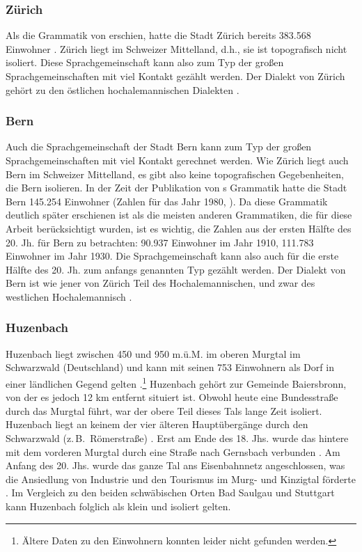 \subsubsection{Zürich}

Als die Grammatik von \citet{Weber1987} erschien, hatte die Stadt Zürich bereits 383.568 Einwohner \citep{Zürich2015}. Zürich liegt im Schweizer Mittelland, d.h., sie ist topografisch nicht isoliert. Diese Sprachgemeinschaft kann also zum Typ der großen Sprachgemeinschaften mit viel Kontakt gezählt werden. Der Dialekt von Zürich gehört zu den östlichen hochalemannischen Dialekten \citep[51–67]{Hotzenköcherle1984}. 

\subsubsection{Bern}

Auch die Sprachgemeinschaft der Stadt Bern kann zum Typ der großen Sprachgemeinschaften mit viel Kontakt gerechnet werden. Wie Zürich liegt auch Bern im Schweizer Mittelland, es gibt also keine topografischen Gegebenheiten, die Bern isolieren. In der Zeit der Publikation von \citeauthor{Marti1985}s \citeyearpar{Marti1985} Grammatik hatte die Stadt Bern 145.254 Einwohner (Zahlen für das Jahr 1980, \citealt{Bern2014}). Da diese Grammatik deutlich später erschienen ist als die meisten anderen Grammatiken, die für diese Arbeit berücksichtigt wurden, ist es wichtig, die Zahlen aus der ersten Hälfte des 20. Jh. für Bern zu betrachten: 90.937 Einwohner im Jahr 1910, 111.783 Einwohner im Jahr 1930. Die Sprachgemeinschaft kann also auch für die erste Hälfte des 20. Jh. zum anfangs genannten Typ gezählt werden. Der Dialekt von Bern ist wie jener von Zürich Teil des Hochalemannischen, und zwar des westlichen Hochalemannisch \citep[51--67]{Hotzenköcherle1984}.

\subsubsection{Huzenbach}\largerpage[1]

Huzenbach liegt zwischen 450 und 950 m.ü.M. im oberen Murgtal im Schwarzwald (Deutschland) und kann mit seinen 753 Einwohnern als Dorf in einer ländlichen Gegend gelten \citep{Baiersbronn2015}.\footnote{Ältere Daten zu den Einwohnern konnten leider nicht gefunden werden.} Huzenbach gehört zur Gemeinde Baiersbronn, von der es jedoch 12 km entfernt situiert ist. Obwohl heute eine Bundesstraße durch das Murgtal führt, war der obere Teil dieses Tals lange Zeit isoliert. Huzenbach liegt an keinem der vier älteren Hauptübergänge durch den Schwarzwald (z.\,B.\ Römerstraße) \citep[28–29]{Baur1967}. Erst am Ende des 18. Jhs. wurde das hintere mit dem vorderen Murgtal durch eine Straße nach Gernsbach verbunden \citep[29]{Baur1967}. Am Anfang des 20. Jhs. wurde das ganze Tal ans Eisenbahnnetz angeschlossen, was die Ansiedlung von Industrie und den Tourismus im Murg- und Kinzigtal förderte \citep[30]{Baur1967}. Im Vergleich zu den beiden schwäbischen Orten Bad Saulgau und Stuttgart kann Huzenbach folglich als klein und isoliert gelten.

